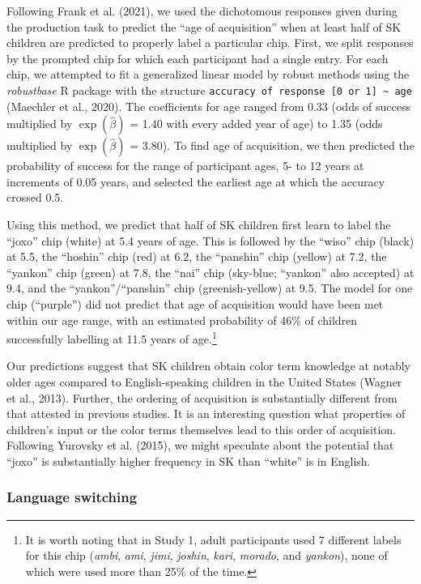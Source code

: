 \documentclass[
  ,apa7,floatsintext]{apa6}
\begin{document}
Following Frank et al. (2021), we used the dichotomous responses given during the production task to predict the ``age of acquisition'' when at least half of SK children are predicted to properly label a particular chip. First, we split responses by the prompted chip for which each participant had a single entry. For each chip, we attempted to fit a generalized linear model by robust methods using the \emph{robustbase} R package with the structure \texttt{accuracy\ of\ response\ {[}0\ or\ 1{]}\ \textasciitilde{}\ age} (Maechler et al., 2020). The coefficients for age ranged from 0.33 (odds of success multiplied by \(\exp{(\hat{\beta})}\) = 1.40 with every added year of age) to 1.35 (odds multiplied by \(\exp{(\hat{\beta})}\) = 3.80). To find age of acquisition, we then predicted the probability of success for the range of participant ages, 5- to 12 years at increments of 0.05 years, and selected the earliest age at which the accuracy crossed 0.5.

Using this method, we predict that half of SK children first learn to label the ``joxo'' chip (white) at 5.4 years of age. This is followed by the ``wiso'' chip (black) at 5.5, the ``hoshin'' chip (red) at 6.2, the ``panshin'' chip (yellow) at 7.2, the ``yankon'' chip (green) at 7.8, the ``nai'' chip (sky-blue; ``yankon'' also accepted) at 9.4, and the ``yankon''/``panshin'' chip (greenish-yellow) at 9.5. The model for one chip (``purple'') did not predict that age of acquisition would have been met within our age range, with an estimated probability of 46\% of children successfully labelling at 11.5 years of age.\footnote{It is worth noting that in Study 1, adult participants used 7 different labels for this chip (\emph{ambi}, \emph{ami}, \emph{jimi}, \emph{joshin}, \emph{kari}, \emph{morado}, and \emph{yankon}), none of which were used more than 25\% of the time.}

Our predictions suggest that SK children obtain color term knowledge at notably older ages compared to English-speaking children in the United States (Wagner et al., 2013). Further, the ordering of acquisition is substantially different from that attested in previous studies. It is an interesting question what properties of children's input or the color terms themselves lead to this order of acquisition. Following Yurovsky et al. (2015), we might speculate about the potential that ``joxo'' is substantially higher frequency in SK than ``white'' is in English.

\hypertarget{language-switching}{%
\subsubsection{Language switching}\label{language-switching}}
\end{document}

